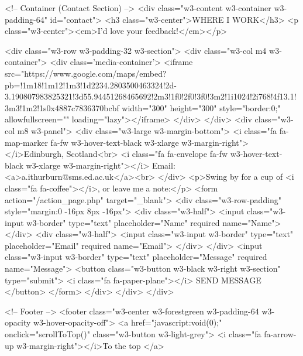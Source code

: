     <!-- Container (Contact Section) -->
    <div class="w3-content w3-container w3-padding-64" id="contact">
        <h3 class="w3-center">WHERE I WORK</h3>
        <p class="w3-center"><em>I'd love your feedback!</em></p>

        <div class="w3-row w3-padding-32 w3-section">
            <div class="w3-col m4 w3-container">
                <div class='media-container'>
                    <iframe src="https://www.google.com/maps/embed?pb=!1m18!1m12!1m3!1d2234.2803500463324!2d-3.190807983825321!3d55.94451268465692!2m3!1f0!2f0!3f0!3m2!1i1024!2i768!4f13.1!3m3!1m2!1s0x4887c7836370bcbf%
                        width="300" height="300" style="border:0;" allowfullscreen="" loading="lazy"></iframe>
                </div>
            </div>
            <div class="w3-col m8 w3-panel">
                <div class="w3-large w3-margin-bottom">
                    <i class="fa fa-map-marker fa-fw w3-hover-text-black w3-xlarge w3-margin-right"></i>Edinburgh, Scotland<br>
                    <i class="fa fa-envelope fa-fw w3-hover-text-black w3-xlarge w3-margin-right"></i> Email: <a>a.ithurburn@sms.ed.ac.uk</a><br>
                </div>
                <p>Swing by for a cup of <i class="fa fa-coffee"></i>, or leave me a note:</p>
                <form action="/action_page.php" target="_blank">
                    <div class="w3-row-padding" style="margin:0 -16px 8px -16px">
                        <div class="w3-half">
                            <input class="w3-input w3-border" type="text" placeholder="Name" required name="Name">
                        </div>
                        <div class="w3-half">
                            <input class="w3-input w3-border" type="text" placeholder="Email" required name="Email">
                        </div>
                    </div>
                    <input class="w3-input w3-border" type="text" placeholder="Message" required name="Message">
                    <button class="w3-button w3-black w3-right w3-section" type="submit">
          <i class="fa fa-paper-plane"></i> SEND MESSAGE
        </button>
                </form>
            </div>
        </div>
    </div>


  <!-- Footer -->
<footer class="w3-center w3-forestgreen w3-padding-64 w3-opacity w3-hover-opacity-off">
    <a href="javascript:void(0);" onclick="scrollToTop()" class="w3-button w3-light-grey">
        <i class="fa fa-arrow-up w3-margin-right"></i>To the top
    </a>
           
